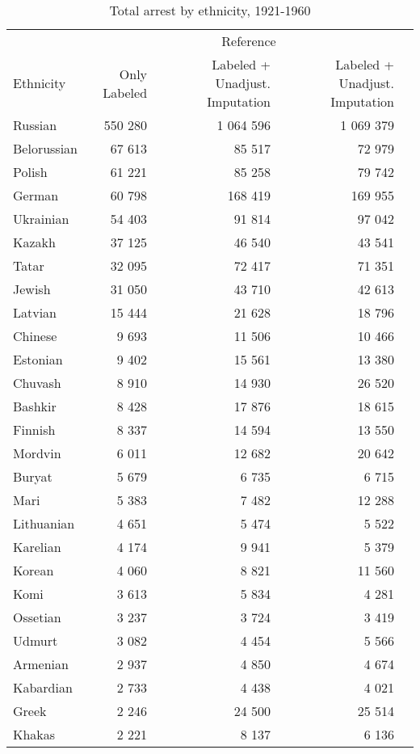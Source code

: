 \begin{table}[t]

\caption{\label{tab:total_arrests_by_ethnicity}Total arrest by ethnicity, 1921-1960}
\centering
\fontsize{8}{10}\selectfont
\begin{tabular}{lrrr}
\toprule
\multicolumn{1}{c}{ } & \multicolumn{4}{c}{Reference} \\
\cmidrule(l{2pt}r{2pt}){2-5}
Ethnicity & Only Labeled & Labeled + Unadjust. Imputation & Labeled + Unadjust. Imputation\\
\midrule
Russian & 550 280 & 1 064 596 & 1 069 379\\
Belorussian & 67 613 & 85 517 & 72 979\\
Polish & 61 221 & 85 258 & 79 742\\
German & 60 798 & 168 419 & 169 955\\
Ukrainian & 54 403 & 91 814 & 97 042\\
Kazakh & 37 125 & 46 540 & 43 541\\
Tatar & 32 095 & 72 417 & 71 351\\
Jewish & 31 050 & 43 710 & 42 613\\
Latvian & 15 444 & 21 628 & 18 796\\
Chinese & 9 693 & 11 506 & 10 466\\
Estonian & 9 402 & 15 561 & 13 380\\
Chuvash & 8 910 & 14 930 & 26 520\\
Bashkir & 8 428 & 17 876 & 18 615\\
Finnish & 8 337 & 14 594 & 13 550\\
Mordvin & 6 011 & 12 682 & 20 642\\
Buryat & 5 679 & 6 735 & 6 715\\
Mari & 5 383 & 7 482 & 12 288\\
Lithuanian & 4 651 & 5 474 & 5 522\\
Karelian & 4 174 & 9 941 & 5 379\\
Korean & 4 060 & 8 821 & 11 560\\
Komi & 3 613 & 5 834 & 4 281\\
Ossetian & 3 237 & 3 724 & 3 419\\
Udmurt & 3 082 & 4 454 & 5 566\\
Armenian & 2 937 & 4 850 & 4 674\\
Kabardian & 2 733 & 4 438 & 4 021\\
Greek & 2 246 & 24 500 & 25 514\\
Khakas & 2 221 & 8 137 & 6 136\\

\end{tabular}
\end{table}
